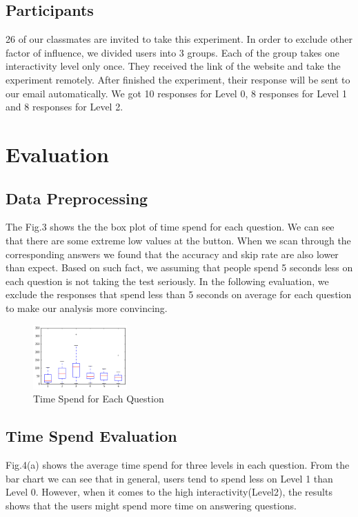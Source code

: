 \documentclass[9pt,journal,compsoc]{IEEEtran}
\begin{document}
\subsection{Participants}
26 of our classmates are invited to take this experiment. In order to exclude other factor of influence, we divided users into 3 groups. Each of the group takes one interactivity level only once. They received the link of the website and take the experiment remotely. After finished the experiment, their response will be sent to our email automatically. We got 10 responses for Level 0, 8 responses for Level 1 and 8 responses for Level 2.

\section{Evaluation}
\large
\subsection{Data Preprocessing}
The Fig.3 shows the the box plot of time spend for each question. We can see that there are some extreme low values at the button. When we scan through the corresponding answers we found that the accuracy and skip rate are also lower than expect. Based on such fact, we assuming that people spend 5 seconds less on each question is not taking the test seriously. In the following evaluation, we exclude the responses that spend less than 5 seconds on average for each question to make our analysis more convincing.
\begin{figure} [H]
  \centering
  \includegraphics[width=0.32\textwidth]{TimeSpendBox.PNG}
  \caption{Time Spend for Each Question}
  \label{fig:6}
\end{figure}
\subsection{Time Spend Evaluation}
Fig.4(a) shows the average time spend for three levels in each question. From the bar chart we can see that in general, users tend to spend less on Level 1 than Level 0. However, when it comes to the high interactivity(Level2), the results shows that the users might spend more time on answering questions.
\end{document}
